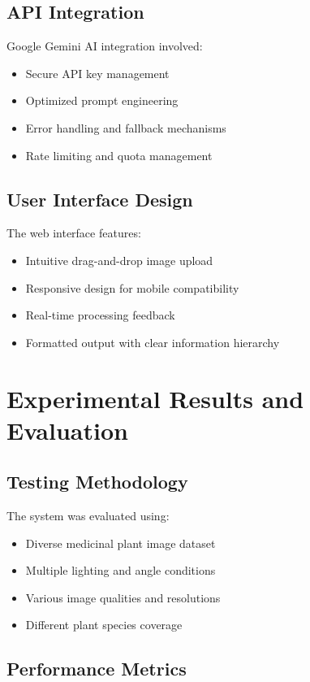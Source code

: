 \documentclass[conference]{IEEEtran}
\begin{document}
\subsection{API Integration}

Google Gemini AI integration involved:
\begin{itemize}
\item Secure API key management
\item Optimized prompt engineering
\item Error handling and fallback mechanisms
\item Rate limiting and quota management
\end{itemize}

\subsection{User Interface Design}

The web interface features:
\begin{itemize}
\item Intuitive drag-and-drop image upload
\item Responsive design for mobile compatibility
\item Real-time processing feedback
\item Formatted output with clear information hierarchy
\end{itemize}

\section{Experimental Results and Evaluation}

\subsection{Testing Methodology}

The system was evaluated using:
\begin{itemize}
\item Diverse medicinal plant image dataset
\item Multiple lighting and angle conditions
\item Various image qualities and resolutions
\item Different plant species coverage
\end{itemize}

\subsection{Performance Metrics}
\end{document}

